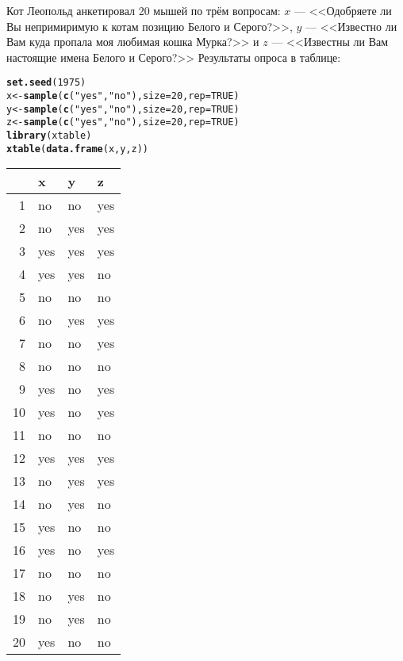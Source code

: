 \documentclass[pdftex,11pt,openany]{book}\usepackage[]{graphicx}\usepackage[]{color}
\makeatletter
\newcommand{\hlnum}[1]{\textcolor[rgb]{0.686,0.059,0.569}{#1}}%
\newcommand{\hlstr}[1]{\textcolor[rgb]{0.192,0.494,0.8}{#1}}%
\newcommand{\hlstd}[1]{\textcolor[rgb]{0.345,0.345,0.345}{#1}}%
\newcommand{\hlkwb}[1]{\textcolor[rgb]{0.69,0.353,0.396}{#1}}%
\newcommand{\hlkwc}[1]{\textcolor[rgb]{0.333,0.667,0.333}{#1}}%
\newcommand{\hlkwd}[1]{\textcolor[rgb]{0.737,0.353,0.396}{\textbf{#1}}}%
\newenvironment{kframe}{%
 \def\at@end@of@kframe{}%
 \ifinner\ifhmode%
  \def\at@end@of@kframe{\end{minipage}}%
  \begin{minipage}{\columnwidth}%
 \fi\fi%
 \def\FrameCommand##1{\hskip\@totalleftmargin \hskip-\fboxsep
 \colorbox{shadecolor}{##1}\hskip-\fboxsep
     \hskip-\linewidth \hskip-\@totalleftmargin \hskip\columnwidth}%
 \MakeFramed {\advance\hsize-\width
   \@totalleftmargin\z@ \linewidth\hsize
   \@setminipage}}%
 {\par\unskip\endMakeFramed%
 \at@end@of@kframe}
\makeatother
\begin{document}
\begin{problem}
Кот Леопольд анкетировал 20 мышей по трём вопросам: $x$ --- <<Одобряете ли Вы непримиримую к котам позицию Белого и Серого?>>, $y$ --- <<Известно ли Вам куда пропала моя любимая кошка Мурка?>> и $z$ --- <<Известны ли Вам настоящие имена Белого и Серого?>> Результаты опроса в таблице:
\begin{kframe}
\begin{alltt}
\hlkwd{set.seed}\hlstd{(}\hlnum{1975}\hlstd{)}
\hlstd{x} \hlkwb{<-} \hlkwd{sample}\hlstd{(}\hlkwd{c}\hlstd{(}\hlstr{"yes"}\hlstd{,}\hlstr{"no"}\hlstd{),}\hlkwc{size}\hlstd{=}\hlnum{20}\hlstd{,}\hlkwc{rep}\hlstd{=}\hlnum{TRUE}\hlstd{)}
\hlstd{y} \hlkwb{<-} \hlkwd{sample}\hlstd{(}\hlkwd{c}\hlstd{(}\hlstr{"yes"}\hlstd{,}\hlstr{"no"}\hlstd{),}\hlkwc{size}\hlstd{=}\hlnum{20}\hlstd{,}\hlkwc{rep}\hlstd{=}\hlnum{TRUE}\hlstd{)}
\hlstd{z} \hlkwb{<-} \hlkwd{sample}\hlstd{(}\hlkwd{c}\hlstd{(}\hlstr{"yes"}\hlstd{,}\hlstr{"no"}\hlstd{),}\hlkwc{size}\hlstd{=}\hlnum{20}\hlstd{,}\hlkwc{rep}\hlstd{=}\hlnum{TRUE}\hlstd{)}
\hlkwd{library}\hlstd{(xtable)}
\hlkwd{xtable}\hlstd{(}\hlkwd{data.frame}\hlstd{(x,y,z))}
\end{alltt}
\end{kframe}%
\begin{table}[ht]
\centering
\begin{tabular}{rlll}
  \hline
 & x & y & z \\ 
  \hline
1 & no & no & yes \\ 
  2 & no & yes & yes \\ 
  3 & yes & yes & yes \\ 
  4 & yes & yes & no \\ 
  5 & no & no & no \\ 
  6 & no & yes & yes \\ 
  7 & no & no & yes \\ 
  8 & no & no & no \\ 
  9 & yes & no & yes \\ 
  10 & yes & no & yes \\ 
  11 & no & no & no \\ 
  12 & yes & yes & yes \\ 
  13 & no & yes & yes \\ 
  14 & no & yes & no \\ 
  15 & yes & no & no \\ 
  16 & yes & no & yes \\ 
  17 & no & no & no \\ 
  18 & no & yes & no \\ 
  19 & no & yes & no \\ 
  20 & yes & no & no \\ 
   \hline
\end{tabular}
\end{table}




\end{problem}
\end{document}
